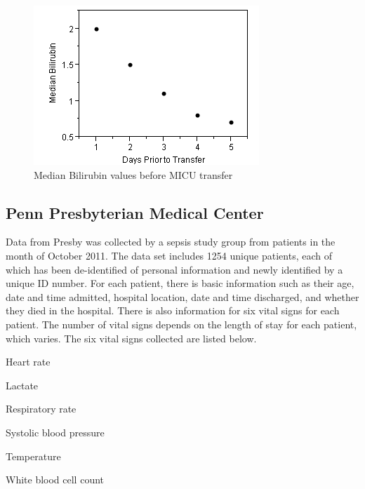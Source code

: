 \documentclass{sig-alternate}
\begin{document}
\begin{figure}
	\begin{center}
		\includegraphics[width=1.0\linewidth]{BilirubinGraph.png}
	\end{center}
	\caption{Median Bilirubin values before MICU transfer}
	\label{fig:bilirubin}
\end{figure}


\subsection{Penn Presbyterian Medical Center}
\label{subsec:presby}
\vspace{10pt}

Data from Presby was collected by a sepsis study group from patients in the month of October 2011.  The data set includes 1254 unique patients, each of which has been de-identified of personal information and newly identified by a unique ID number.  For each patient, there is basic information such as their age, date and time admitted, hospital location, date and time discharged, and whether they died in the hospital.  There is also information for six vital signs for each patient.  The number of vital signs depends on the length of stay for each patient, which varies.  The six vital signs collected are listed below.

\begin{itemize*}
  \item Heart rate
  \item Lactate
  \item Respiratory rate
  \item Systolic blood pressure
  \item Temperature
  \item White blood cell count
\end{itemize*}
\end{document}
